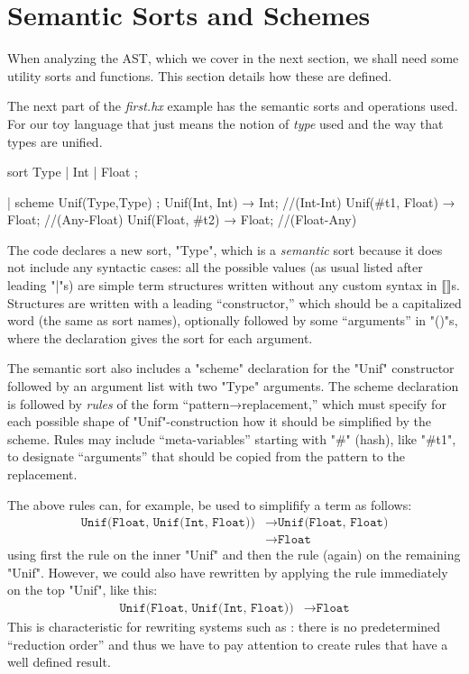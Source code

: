 \documentclass[11pt]{article} %
\begin{document}
\section{Semantic Sorts and Schemes}
\label{sec:schemes}

When analyzing the AST, which we cover in the next section, we shall need some utility sorts and
functions. This section details how these are defined.

\begin{example}\label{ex:types}
  The next part of the \emph{first.hx} example has the semantic sorts and operations used. For our
  toy language that just means the notion of \emph{type} used and the way that types are unified.
\begin{code}
sort Type | Int | Float ;

| scheme Unif(Type,Type) ;
Unif(Int, Int) → Int;       //(Int-Int)
Unif(#t1, Float) → Float;   //(Any-Float)
Unif(Float, #t2) → Float;   //(Float-Any)
\end{code}
The code declares a new sort, "Type", which is a \emph{semantic} sort because it does not include
any syntactic cases: all the possible values (as usual listed after leading "|"s) are simple term
structures written without any custom syntax in ⟦⟧s.  Structures are written with a leading
``constructor,'' which should be a capitalized word (the same as sort names), optionally followed by
some ``arguments'' in "()"s, where the declaration gives the sort for each argument.

The semantic sort also includes a "scheme" declaration for the "Unif" constructor followed by an
argument list with two "Type" arguments. The scheme declaration is followed by \emph{rules} of the
form ``pattern→replacement,'' which must specify for each possible shape of "Unif"-construction how
it should be simplified by the scheme.  Rules may include ``meta-variables'' starting with "#"
(hash), like "#t1", to designate ``arguments'' that should be copied from the pattern to the
replacement.

The above rules can, for example, be used to simplifify a term as follows:
\begin{align*}
  \texttt{Unif(Float, Unif(Int, Float))}
  &→ \texttt{Unif(Float, Float)}\\
  &→ \texttt{Float}
\end{align*}
using first the  rule on the inner "Unif" and then the  rule
(again) on the remaining "Unif".  However, we could also have rewritten by applying the
 rule immediately on the top "Unif", like this:
\begin{align*}
  \texttt{Unif(Float, Unif(Int, Float))}
  &→ \texttt{Float}
\end{align*}
This is characteristic for rewriting systems such as \HAX: there is no predetermined ``reduction
order'' and thus we have to pay attention to create rules that have a well defined result.


\end{example}
\end{document}
